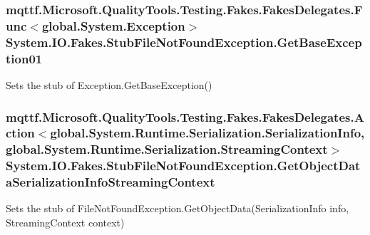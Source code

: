 \hypertarget{class_system_1_1_i_o_1_1_fakes_1_1_stub_file_not_found_exception_a369fa846ea0ae44368657137106369ad}{
\subsubsection[{Get\-Base\-Exception01}]{\setlength{\rightskip}{0pt plus 5cm}mqttf.\-Microsoft.\-Quality\-Tools.\-Testing.\-Fakes.\-Fakes\-Delegates.\-Func$<$global.\-System.\-Exception$>$ System.\-I\-O.\-Fakes.\-Stub\-File\-Not\-Found\-Exception.\-Get\-Base\-Exception01}}\label{class_system_1_1_i_o_1_1_fakes_1_1_stub_file_not_found_exception_a369fa846ea0ae44368657137106369ad}


Sets the stub of Exception.\-Get\-Base\-Exception()

\hypertarget{class_system_1_1_i_o_1_1_fakes_1_1_stub_file_not_found_exception_ac4f62229721b20f1f5e85f786633f354}{
\subsubsection[{Get\-Object\-Data\-Serialization\-Info\-Streaming\-Context}]{\setlength{\rightskip}{0pt plus 5cm}mqttf.\-Microsoft.\-Quality\-Tools.\-Testing.\-Fakes.\-Fakes\-Delegates.\-Action$<$global.\-System.\-Runtime.\-Serialization.\-Serialization\-Info, global.\-System.\-Runtime.\-Serialization.\-Streaming\-Context$>$ System.\-I\-O.\-Fakes.\-Stub\-File\-Not\-Found\-Exception.\-Get\-Object\-Data\-Serialization\-Info\-Streaming\-Context}}\label{class_system_1_1_i_o_1_1_fakes_1_1_stub_file_not_found_exception_ac4f62229721b20f1f5e85f786633f354}


Sets the stub of File\-Not\-Found\-Exception.\-Get\-Object\-Data(\-Serialization\-Info info, Streaming\-Context context)


